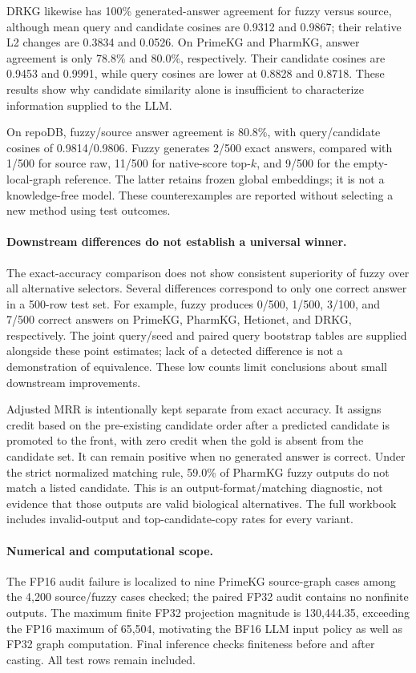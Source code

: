DRKG likewise has 100\% generated-answer agreement for fuzzy versus source,
although mean query and candidate cosines are 0.9312 and 0.9867; their relative
L2 changes are 0.3834 and 0.0526. On PrimeKG and PharmKG, answer agreement is only 78.8\% and
80.0\%, respectively. Their candidate cosines are 0.9453 and 0.9991, while
query cosines are lower at 0.8828 and 0.8718. These results show why candidate
similarity alone is insufficient to characterize information supplied to the
LLM.

On repoDB, fuzzy/source answer agreement is 80.8\%, with query/candidate
cosines of 0.9814/0.9806. Fuzzy generates 2/500 exact answers, compared with
1/500 for source raw, 11/500 for native-score top-$k$, and 9/500 for the
empty-local-graph reference. The latter retains frozen global embeddings;
it is not a knowledge-free model. These counterexamples are reported without
selecting a new method using test outcomes.

\paragraph{Downstream differences do not establish a universal winner.}
The exact-accuracy comparison does not show consistent superiority of fuzzy
over all alternative selectors. Several differences correspond to only one
correct answer in a 500-row test set. For example, fuzzy produces 0/500,
1/500, 3/100, and 7/500 correct answers on PrimeKG, PharmKG, Hetionet, and
DRKG, respectively. The joint query/seed and paired query bootstrap tables
are supplied alongside these point estimates; lack of a detected difference
is not a demonstration of equivalence. These low counts limit conclusions
about small downstream improvements.

Adjusted MRR is intentionally kept separate from exact accuracy. It assigns
credit based on the pre-existing candidate order after a predicted candidate
is promoted to the front, with zero credit when the gold is absent from the
candidate set. It can remain positive when no generated answer is correct.
Under the strict normalized matching rule, 59.0\% of PharmKG fuzzy outputs
do not match a listed candidate. This is an output-format/matching diagnostic,
not evidence that those outputs are valid biological alternatives. The full
workbook includes invalid-output and top-candidate-copy rates for every variant.

\paragraph{Numerical and computational scope.}
The FP16 audit failure is localized to nine PrimeKG source-graph cases among
the 4,200 source/fuzzy cases checked; the paired FP32 audit contains no
nonfinite outputs. The maximum finite FP32 projection magnitude is
130,444.35, exceeding the FP16 maximum of 65,504, motivating the BF16 LLM
input policy as well as FP32 graph computation. Final inference checks
finiteness before and after casting. All test rows remain included.

